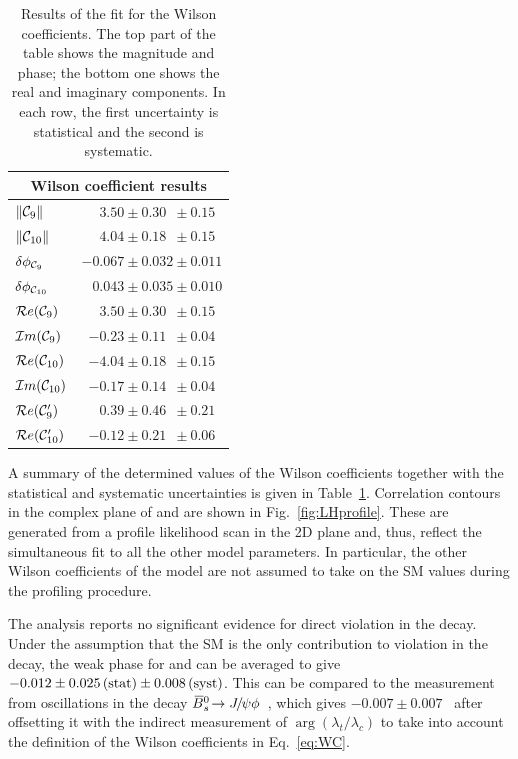 \begin{table}
\centering
\caption{Results of the fit for the Wilson coefficients. The top part of the table shows the magnitude and phase; the bottom one shows the real and imaginary components. In each row, the first uncertainty is statistical and the second is systematic.}
\begin{tabular}{l  r }
    \toprule
    \multicolumn{2}{c}{Wilson coefficient results} \\
    \midrule
    $\left\|\mathcal{C}_9\right\|$ & $3.50 \pm 0.30\phantom{0} \pm 0.15\phantom{0}$ \\
    $\left\|\mathcal{C}_{10}\right\|$ & $4.04 \pm 0.18\phantom{0} \pm 0.15\phantom{0}$ \\
    $\delta\phi_{\mathcal{C}_9}$ & $-0.067 \pm 0.032 \pm 0.011$ \\
    $\delta\phi_{\mathcal{C}_{10}}$ & $0.043 \pm 0.035 \pm 0.010$ \\
    \midrule
    $\mathcal{R}e(\mathcal{C}_9)$ & $3.50 \pm 0.30\phantom{0}  \pm 0.15\phantom{0}$ \\
    $\mathcal{I}m(\mathcal{C}_9)$ & $-0.23 \pm 0.11\phantom{0}  \pm 0.04\phantom{0}$ \\
    $\mathcal{R}e(\mathcal{C}_{10})$ & $-4.04 \pm 0.18\phantom{0}  \pm 0.15\phantom{0}$ \\
    $\mathcal{I}m(\mathcal{C}_{10})$ & $-0.17 \pm 0.14\phantom{0}  \pm 0.04\phantom{0}$ \\
    $\mathcal{R}e(\mathcal{C}_9^\prime)$ & $\phantom{-}0.39 \pm 0.46\phantom{0} \pm 0.21\phantom{0}$ \\
    $\mathcal{R}e(\mathcal{C}_{10}^\prime)$ & $-0.12 \pm 0.21\phantom{0} \pm 0.06\phantom{0}$ \\
    \bottomrule
\end{tabular}
\label{tab:WCResults}
\end{table}

A summary of the determined values of the Wilson coefficients together with the statistical and systematic uncertainties is given in Table~\ref{tab:WCResults}. Correlation contours in the complex plane of  and  are shown in Fig.~\ref{fig:LHprofile}. These are generated from a profile likelihood scan in the 2D plane and, thus, reflect the simultaneous fit to all the other model parameters. In particular, the other Wilson coefficients of the model are not assumed to take on the SM values during the profiling procedure.

The analysis reports no significant evidence for direct \CP violation in the \mbox{\BdbToKstbMuMu} decay. Under the assumption that the SM is the only contribution to \CP violation in the decay, the weak phase for  and  can be averaged to give \mbox{$-0.012\pm0.025 \text{\,(stat)} \pm 0.008 \text{\,(syst)}$}. This can be compared to the measurement from \Bs oscillations in the decay ${{\kern 0.18em\overline{\kern -0.18em B}}{}^0_{s}}\!\rightarrow {\ensuremath{{J\mskip -3mu/\mskip -2mu\psi}}}\phi$~\cite{HFLAV23}, which gives $-0.007 \pm 0.007$~\cite{HFLAV23} after offsetting it with the indirect measurement of $\arg(\lambda_t/\lambda_c)$ to take into account the definition of the Wilson coefficients in Eq.~\ref{eq:WC}.

